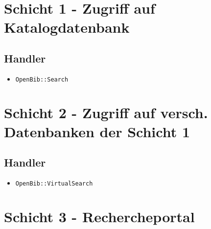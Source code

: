 \documentclass[11pt, twoside, a4paper, BCOR8mm, DIV12, bibtotoc,idxtotoc]{scrbook}
\begin{document}
\section{Schicht 1 - Zugriff auf Katalogdatenbank}

\subsection{Handler}
\begin{itemize}
\item \texttt{OpenBib::Search}
\end{itemize}

\section{Schicht 2 - Zugriff auf versch. Datenbanken der Schicht 1}

\subsection{Handler}
\begin{itemize}
\item \texttt{OpenBib::VirtualSearch}
\end{itemize}

\section{Schicht 3 - Rechercheportal}
\end{document}
